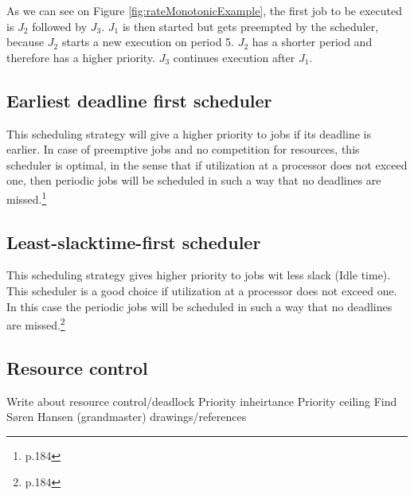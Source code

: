 As we can see on Figure \ref{fig:rateMonotonicExample}, the first job to be executed is $J_2$ followed by $J_3$. $J_1$ is then started but gets preempted by the scheduler, because $J_2$ starts a new execution on period 5. $J_2$ has a shorter period and therefore has a higher priority. $J_3$ continues execution after $J_1$.

\subsection{Earliest deadline first scheduler}
This scheduling strategy will give a higher priority to jobs if its deadline is
earlier. In case of preemptive jobs and no competition for resources, this scheduler
is optimal, in the sense that if utilization at a processor does not exceed one, then
periodic jobs will be scheduled in such a way that no deadlines are missed.\footnote{\cite{Fokkink1965} p.184}


\subsection{Least-slacktime-first scheduler}
This scheduling strategy gives higher priority to jobs wit less slack (Idle time). This scheduler is a good choice if utilization at a processor does not exceed one. In this case the periodic jobs will be scheduled in such a way that no deadlines are missed.\footnote{\cite{Fokkink1965} p.184}

\subsection{Resource control}
Write about resource control/deadlock
Priority inheirtance
Priority ceiling
Find Søren Hansen (grandmaster) drawings/references